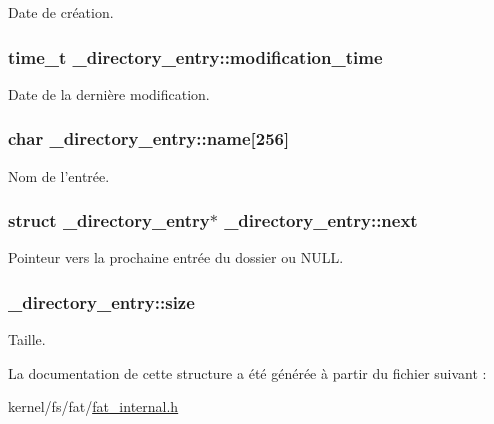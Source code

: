 Date de création. \hypertarget{struct__directory__entry_a120c3a3857bd7892a0fc2e6644e6f188}{
\subsubsection[{modification\-\_\-time}]{\setlength{\rightskip}{0pt plus 5cm}time\-\_\-t \-\_\-directory\-\_\-entry\-::modification\-\_\-time}}\label{struct__directory__entry_a120c3a3857bd7892a0fc2e6644e6f188}
Date de la dernière modification. \hypertarget{struct__directory__entry_ac9142fdeb8e265f045fee1edf9608c78}{
\subsubsection[{name}]{\setlength{\rightskip}{0pt plus 5cm}char \-\_\-directory\-\_\-entry\-::name\mbox{[}256\mbox{]}}}\label{struct__directory__entry_ac9142fdeb8e265f045fee1edf9608c78}
Nom de l'entrée. \hypertarget{struct__directory__entry_a75001bda0d1d80e4ff5350ad69f83030}{
\subsubsection[{next}]{\setlength{\rightskip}{0pt plus 5cm}struct {\bf \-\_\-directory\-\_\-entry}$\ast$ \-\_\-directory\-\_\-entry\-::next}}\label{struct__directory__entry_a75001bda0d1d80e4ff5350ad69f83030}
Pointeur vers la prochaine entrée du dossier ou N\-U\-L\-L. \hypertarget{struct__directory__entry_a5d6f559c1b7ab2b5a64643073172cc25}{
\subsubsection[{size}]{ \-\_\-directory\-\_\-entry\-::size}}\label{struct__directory__entry_a5d6f559c1b7ab2b5a64643073172cc25}
Taille. 

La documentation de cette structure a été générée à partir du fichier suivant \-:\begin{DoxyCompactItemize}
\item 
kernel/fs/fat/\hyperlink{fat__internal_8h}{fat\-\_\-internal.\-h}\end{DoxyCompactItemize}
